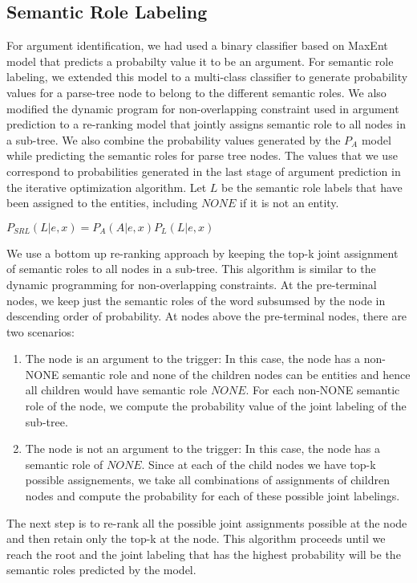 \subsection{Semantic Role Labeling}
For argument identification, we had used a binary classifier based on MaxEnt model that predicts a probabilty value it to be an argument. For semantic role labeling, we extended this model to a multi-class classifier to generate probability values for a parse-tree node to belong to the different semantic roles. We also modified the dynamic program for non-overlapping constraint used in argument prediction to a re-ranking model that jointly assigns semantic role to all nodes in a sub-tree. We also combine the probability values generated by the $P_A$ model while predicting the semantic roles for parse tree nodes. The values that we use correspond to probabilities generated in the last stage of argument prediction in the iterative optimization algorithm. Let $L$ be the semantic role labels that have been assigned to the entities, including $NONE$ if it is not an entity.

$P_{SRL}(L| e, x) = P_A(A|e, x) P_L(L|e,x) $

We use a bottom up re-ranking approach by keeping the top-k joint assignment of semantic roles to all nodes in a sub-tree. This algorithm is similar to the dynamic programming for non-overlapping constraints. At the pre-terminal nodes, we keep just the semantic roles of the word subsumsed by the node in descending order of probability. At nodes above the pre-terminal nodes, there are two scenarios:

\begin{enumerate}
\item The node is an argument to the trigger: In this case, the node has a non-NONE semantic role and none of the children nodes can be entities and hence all children would have semantic role $NONE$. For each non-NONE semantic role of the node, we compute the probability value of the joint labeling of the sub-tree.
\item The node is not an argument to the trigger: In this case, the node has a semantic role of $NONE$. Since at each of the child nodes we have top-k possible assignements, we take all combinations of assignments of children nodes and compute the probability for each of these possible joint labelings.
\end{enumerate}

The next step is to re-rank all the possible joint assignments possible at the node and then retain only the top-k at the node. This algorithm proceeds until we reach the root and the joint labeling that has the highest probability will be the semantic roles predicted by the model.
